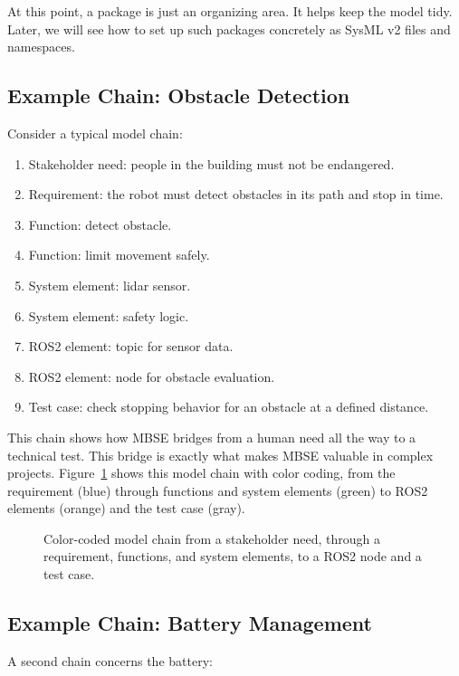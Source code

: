 At this point, a package is just an organizing area. It helps keep the model tidy. Later, we will see how to set up such packages concretely as SysML v2 files and namespaces.

\subsection{Example Chain: Obstacle Detection}
Consider a typical model chain:

\begin{enumerate}
    \item Stakeholder need: people in the building must not be endangered.
    \item Requirement: the robot must detect obstacles in its path and stop in time.
    \item Function: detect obstacle.
    \item Function: limit movement safely.
    \item System element: lidar sensor.
    \item System element: safety logic.
    \item ROS2 element: topic for sensor data.
    \item ROS2 element: node for obstacle evaluation.
    \item Test case: check stopping behavior for an obstacle at a defined distance.
\end{enumerate}

This chain shows how MBSE bridges from a human need all the way to a technical test. This bridge is exactly what makes MBSE valuable in complex projects. Figure~\ref{fig:kap02-modellkette-traceability} shows this model chain with color coding, from the requirement (blue) through functions and system elements (green) to ROS2 elements (orange) and the test case (gray).

\begin{figure}[H]
  \centering
  \caption{Color-coded model chain from a stakeholder need, through a requirement, functions, and system elements, to a ROS2 node and a test case.}
  \label{fig:kap02-modellkette-traceability}
\end{figure}

\subsection{Example Chain: Battery Management}
A second chain concerns the battery:

